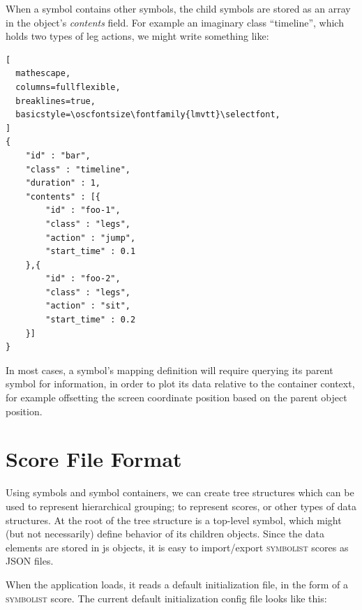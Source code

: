 \documentclass{article}
\def\symbolist{\textsc{symbolist}\xspace}
\def\oscfontsize{\footnotesize}
\begin{document}
When a symbol contains other symbols, the child symbols are stored as an array in the object's \textit{contents} field. For example an imaginary class ``timeline'', which holds two types of leg actions, we might write something like:

\begin{lstlisting}[
  mathescape,
  columns=fullflexible,
  breaklines=true,
  basicstyle=\oscfontsize\fontfamily{lmvtt}\selectfont,
]
{
    "id" : "bar",
    "class" : "timeline",
    "duration" : 1,
    "contents" : [{
        "id" : "foo-1",
        "class" : "legs",
        "action" : "jump",
        "start_time" : 0.1
    },{
        "id" : "foo-2",
        "class" : "legs",
        "action" : "sit",
        "start_time" : 0.2
    }]
}

\end{lstlisting}

In most cases, a symbol's mapping definition will require querying its parent symbol for information, in order to plot its data relative to the container context, for example offsetting the screen coordinate position based on the parent object position.

\section{Score File Format}\label{sec:score}

Using symbols and symbol containers, we can create tree structures which can be used to represent hierarchical grouping; to represent scores, or other types of data structures.
At the root of the tree structure is a top-level symbol, which might (but not necessarily) define behavior of its children objects.
Since the data elements are stored in js objects, it is easy to import/export \symbolist scores as JSON files.

When the application loads, it reads a default initialization file, in the form of a \symbolist score.
The current default initialization config file looks like this:
\end{document}
